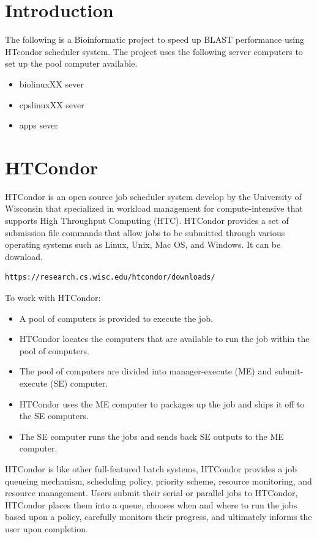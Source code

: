 \documentclass{article}
\begin{document}
\section{Introduction}
The following is a Bioinformatic project to speed up BLAST performance using HTcondor scheduler system. The project uses the following server computers to set up the pool computer available.
\begin{itemize}
 \item biolinuxXX sever
 \item cpslinuxXX sever
 \item apps sever
\end{itemize}

\section{HTCondor}
HTCondor is an open source job scheduler system develop by the University of Wisconsin that specialized in workload management for compute-intensive that supports High Throughput Computing (HTC). 
HTCondor provides a set of submission file commands that allow jobs to be submitted through various operating systems such as Linux, Unix, Mac OS, and Windows. It can be download. 
\footnotesize
\begin{verbatim}
https://research.cs.wisc.edu/htcondor/downloads/
\end{verbatim}
\normalsize
To work with HTCondor: 
\begin{itemize}
\item A pool of computers is provided to execute the job. 
\item HTCondor locates the computers that are available to run the job within the pool of computers. 
\item The pool of computers are divided into manager-execute (ME) and submit-execute (SE) computer.
\item HTCondor uses the ME computer to packages up the job and ships it off to the SE computers.
\item The SE computer runs the jobs and sends back  SE outputs to the ME computer. 
\end{itemize}

HTCondor is like other full-featured batch systems, HTCondor provides a job queueing mechanism, scheduling policy, priority scheme, resource monitoring, and resource management.
Users submit their serial or parallel jobs to HTCondor, HTCondor places them into a queue, chooses when and where to run the jobs based upon a policy, carefully monitors their progress, 
and ultimately informs the user upon completion\cite{HTcondor_What_is}.
\end{document}
